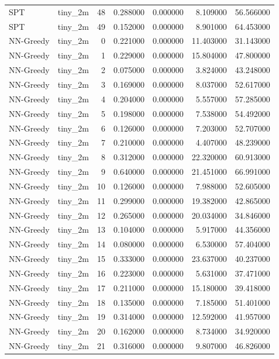 \begin{tabular}{llrrrrr}
SPT & tiny_2m & 48 & 0.288000 & 0.000000 & 8.109000 & 56.566000 \\
SPT & tiny_2m & 49 & 0.152000 & 0.000000 & 8.901000 & 64.453000 \\
NN-Greedy & tiny_2m & 0 & 0.221000 & 0.000000 & 11.403000 & 31.143000 \\
NN-Greedy & tiny_2m & 1 & 0.229000 & 0.000000 & 15.804000 & 47.800000 \\
NN-Greedy & tiny_2m & 2 & 0.075000 & 0.000000 & 3.824000 & 43.248000 \\
NN-Greedy & tiny_2m & 3 & 0.169000 & 0.000000 & 8.037000 & 52.617000 \\
NN-Greedy & tiny_2m & 4 & 0.204000 & 0.000000 & 5.557000 & 57.285000 \\
NN-Greedy & tiny_2m & 5 & 0.198000 & 0.000000 & 7.538000 & 54.492000 \\
NN-Greedy & tiny_2m & 6 & 0.126000 & 0.000000 & 7.203000 & 52.707000 \\
NN-Greedy & tiny_2m & 7 & 0.210000 & 0.000000 & 4.407000 & 48.239000 \\
NN-Greedy & tiny_2m & 8 & 0.312000 & 0.000000 & 22.320000 & 60.913000 \\
NN-Greedy & tiny_2m & 9 & 0.640000 & 0.000000 & 21.451000 & 66.991000 \\
NN-Greedy & tiny_2m & 10 & 0.126000 & 0.000000 & 7.988000 & 52.605000 \\
NN-Greedy & tiny_2m & 11 & 0.299000 & 0.000000 & 19.382000 & 42.865000 \\
NN-Greedy & tiny_2m & 12 & 0.265000 & 0.000000 & 20.034000 & 34.846000 \\
NN-Greedy & tiny_2m & 13 & 0.104000 & 0.000000 & 5.917000 & 44.356000 \\
NN-Greedy & tiny_2m & 14 & 0.080000 & 0.000000 & 6.530000 & 57.404000 \\
NN-Greedy & tiny_2m & 15 & 0.333000 & 0.000000 & 23.637000 & 40.237000 \\
NN-Greedy & tiny_2m & 16 & 0.223000 & 0.000000 & 5.631000 & 37.471000 \\
NN-Greedy & tiny_2m & 17 & 0.211000 & 0.000000 & 15.180000 & 39.418000 \\
NN-Greedy & tiny_2m & 18 & 0.135000 & 0.000000 & 7.185000 & 51.401000 \\
NN-Greedy & tiny_2m & 19 & 0.314000 & 0.000000 & 12.592000 & 41.957000 \\
NN-Greedy & tiny_2m & 20 & 0.162000 & 0.000000 & 8.734000 & 34.920000 \\
NN-Greedy & tiny_2m & 21 & 0.316000 & 0.000000 & 9.807000 & 46.826000 \\

\end{tabular}
